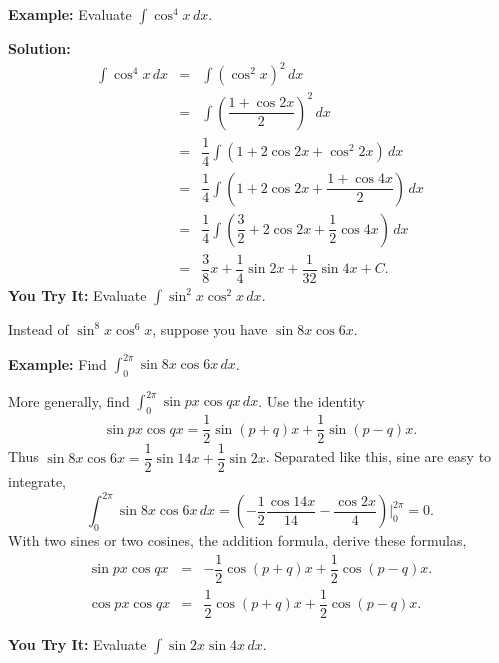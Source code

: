 \documentclass[titlepage,a4paper,12pt]{report}
\begin{document}
\noindent \textbf{Example:} Evaluate $\displaystyle \int \cos ^4 x \, dx$.

\noindent \textbf{Solution:} 
\begin{eqnarray*}
 \int \cos ^4 x \, dx &=& \int (\cos ^2 x)^2 \,dx\\
 &=& \int \left(\dfrac{1+\cos 2x}{2}\right)^2 \, dx\\
 &=& \dfrac{1}{4}\int (1+2\cos 2x +\cos ^2 2x)\, dx\\
 &=&\dfrac{1}{4}\int \left(1+2\cos 2x+\dfrac{1+\cos 4x}{2}\right)\, dx\\
 &=& \dfrac{1}{4} \int \left(\dfrac{3}{2}+2\cos 2x+\dfrac{1}{2}\cos 4x\right)\, dx\\
 &=& \dfrac{3}{8}x+\dfrac{1}{4}\sin 2x +\dfrac{1}{32}\sin 4x +C.
\end{eqnarray*}
\textbf{You Try It:} Evaluate $\displaystyle \int \sin ^2 x \cos ^2 x\, dx$.  

\noindent Instead of $\sin ^8 x \cos ^6 x$, suppose you have $\sin 8x\cos 6x$.

\noindent \textbf{Example:} Find $\displaystyle \int _0^{2\pi}\sin 8x \cos 6x \, dx$.

\noindent More generally, find $\displaystyle \int _0^{2\pi} \sin px \cos qx\, dx$. Use the identity 
\begin{equation*}
\sin px \cos qx =\dfrac{1}{2}\sin (p+q)x +\dfrac{1}{2}\sin (p-q)x.
\end{equation*}
Thus $\sin 8x\cos 6x=\dfrac{1}{2}\sin 14x +\dfrac{1}{2}\sin 2x$. Separated like this, sine are easy to integrate, 
\begin{equation*}
\int _{0}^{2\pi}\sin 8x \cos 6x \, dx =\left(-\dfrac{1}{2}\dfrac{\cos 14x}{14}-\dfrac{\cos 2x}{4}\right)\biggl| _{0}^{2\pi}=0.
\end{equation*}
With two sines or two cosines, the addition formula, derive these formulas, 
\begin{eqnarray*}
\sin px \cos qx  &=& -\dfrac{1}{2}\cos (p+q)x+\dfrac{1}{2}\cos (p-q)x.\\
\cos px \cos qx &=& \dfrac{1}{2}\cos (p+q)x +\dfrac{1}{2}\cos (p-q)x.
\end{eqnarray*}

\noindent \textbf{You Try It:} Evaluate $\displaystyle \int \sin 2x \sin 4x\, dx$.
\end{document}
